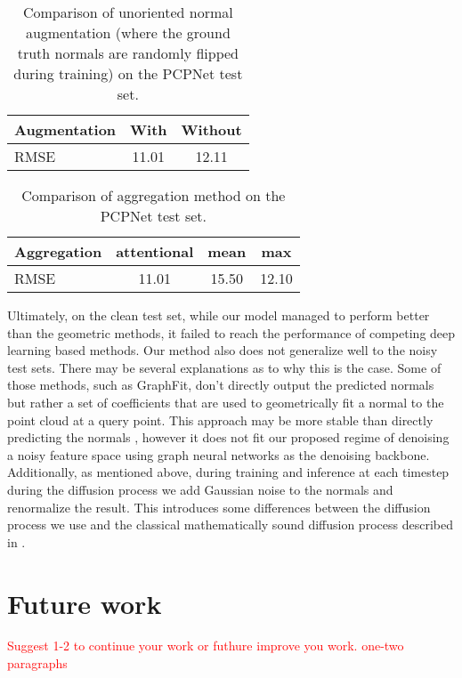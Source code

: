 \documentclass{acmart}
\begin{document}
\begin{table}[ht]
  \centering
  \caption{Comparison of unoriented normal augmentation (where the ground truth normals are randomly flipped during training) on the PCPNet test set.}
  \label{tab:augmentation_comparison}
  \begin{tabular}{lcc}
  \hline
  \textbf{Augmentation} & \textbf{With} & \textbf{Without} \\ \hline
  RMSE & 11.01 & 12.11 \\ \hline
  \end{tabular}
  \end{table}
\begin{table}[ht]
  \centering
  \caption{Comparison of aggregation method on the PCPNet test set.}
  \label{tab:aggregation_comparison}
  \begin{tabular}{lccc}
  \hline
  \textbf{Aggregation} & \textbf{attentional} & \textbf{mean} & \textbf{max} \\ \hline
  RMSE & 11.01 & 15.50 & 12.10 \\ \hline
  \end{tabular}
  \end{table}
Ultimately, on the clean test set, while our model managed to perform better than the geometric methods, it failed to reach the performance of competing deep learning based methods. Our method also does not generalize well to the noisy test sets. There may be several explanations as to why this is the case. Some of those methods, such as GraphFit, don't directly output the predicted normals but rather a set of coefficients that are used to geometrically fit a normal to the point cloud at a query point. This approach may be more stable than directly predicting the normals \cite{zhu2021adafit}, however it does not fit our proposed regime of denoising a noisy feature space using graph neural networks as the denoising backbone. Additionally, as mentioned above, during training and inference at each timestep during the diffusion process we add Gaussian noise to the normals and renormalize the result. This introduces some differences between the diffusion process we use and the classical mathematically sound diffusion process described in \cite{ho2020denoising}.


\section{Future work}
\textcolor{red}{Suggest 1-2 to continue your work or futhure improve you work.
one-two paragraphs}
\end{document}
